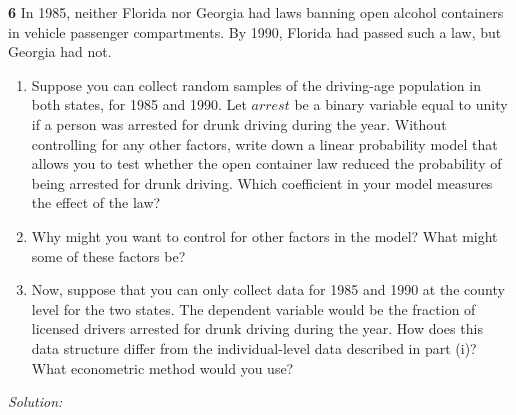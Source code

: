 \documentclass[11pt,a4paper]{article}
\newif\ifsolucoes
\newcommand{\espacoresol}{4.5cm}   %
\newcommand{\resolespaco}{\ifsolucoes\else\par\textit{Solution:}\vspace{\espacoresol}\par\fi}
\begin{document}
\noindent\textbf{6} In 1985, neither Florida nor Georgia had laws banning open alcohol containers in vehicle
passenger compartments. By 1990, Florida had passed such a law, but Georgia had not.
\begin{enumerate}[label=(\roman*)]
\item Suppose you can collect random samples of the driving-age population in both states, for 1985 and
1990. Let $arrest$ be a binary variable equal to unity if a person was arrested for drunk driving during
the year. Without controlling for any other factors, write down a linear probability model that allows you
to test whether the open container law reduced the probability of being arrested for drunk driving. Which
coefficient in your model measures the effect of the law?
\item Why might you want to control for other factors in the model? What might some of these factors be?
\item Now, suppose that you can only collect data for 1985 and 1990 at the county level for the two
states. The dependent variable would be the fraction of licensed drivers arrested for drunk driving during
the year. How does this data structure differ from the individual-level data described in part (i)? What
econometric method would you use?
\end{enumerate}
\resolespaco
\end{document}
